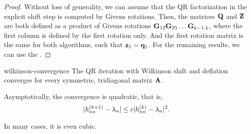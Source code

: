 \begin{proof}
  Without loss of generality, we can assume that the QR factorization
  in the explicit shift step is computed by Givens rotations.  Then,
  the matrices $\mathbf Q$ and $\mathbf Z$ are both defined as a product of
  Givens rotations $\mathbf G_{12}\mathbf G_{23}\dots\mathbf G_{k-1,k}$, where the
  first column is defined by the first rotation only. And the first
  rotation matrix is the same for both algorithms, such that
  $\mathbf z_1 = \mathbf q_1$. For the remaining results, we can use the
  .
\end{proof}

\begin{Theorem}{wilkinson-convergence}
  The QR iteration with Wilkinson shift and deflation converges for
  every symmetric, tridiagonal matrix $\mathbf A$.

  Asymptotically, the convergence is quadratic, that is,
  \begin{gather}
    \lvert h_{nn}^{(k+1)} - \lambda_n\rvert \le c \lvert h_{nn}^{(k)} - \lambda_n\rvert^2.
  \end{gather}

  In many cases, it is even cubic.
\end{Theorem}

